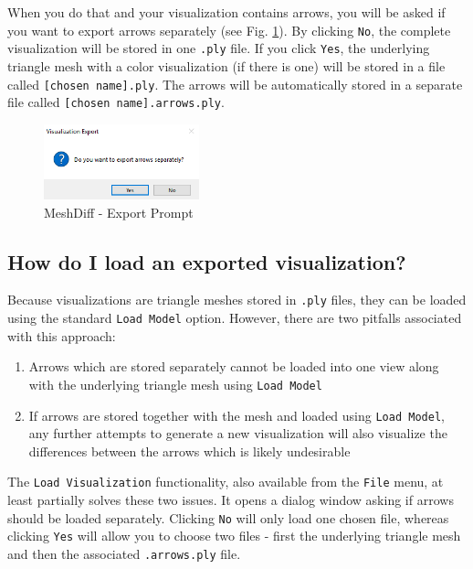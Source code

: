 When you do that and your visualization contains arrows, you will be asked if you want to export arrows separately (see Fig. \ref{fig:meshdiff-separate_arrows_prompt}). By clicking \verb+No+, the complete visualization will be stored in one \verb+.ply+ file. If you click \verb+Yes+, the underlying triangle mesh with a color visualization (if there is one) will be stored in a file called \verb+[chosen name].ply+. The arrows will be automatically stored in a separate file called \verb+[chosen name].arrows.ply+.

\begin{figure}[h]
\centering
\includegraphics[width=0.4\textwidth]{./img/meshdiff-separate_arrows.PNG}
\caption[MeshDiff - Export Prompt]{MeshDiff - Export Prompt}
\label{fig:meshdiff-separate_arrows_prompt}
\end{figure}

\subsection{How do I load an exported visualization?}
\label{attch:user_doc-load_vis}

Because visualizations are triangle meshes stored in \verb+.ply+ files, they can be loaded using the standard \verb+Load Model+ option. However, there are two pitfalls associated with this approach:

\begin{enumerate}
\item Arrows which are stored separately cannot be loaded into one view along with the underlying triangle mesh using \verb+Load Model+
\item If arrows are stored together with the mesh and loaded using \verb+Load Model+, any further attempts to generate a new visualization will also visualize the differences between the arrows which is likely undesirable
\end{enumerate}

The \verb+Load Visualization+ functionality, also available from the \verb+File+ menu, at least partially solves these two issues. It opens a dialog window asking if arrows should be loaded separately. Clicking \verb+No+ will only load one chosen file, whereas clicking \verb+Yes+ will allow you to choose two files - first the underlying triangle mesh and then the associated \verb+.arrows.ply+ file.

